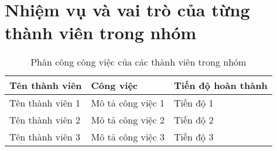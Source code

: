 \chapter{Nhiệm vụ và vai trò của từng thành viên trong nhóm}
\label{ch:team_roles}

\begin{table}[h!]
    \centering
    \begin{tabular}{|l|l|l|}
        \hline
        \textbf{Tên thành viên} & \textbf{Công việc} & \textbf{Tiến độ hoàn thành} \\
        \hline
        Tên thành viên 1 & Mô tả công việc 1 & Tiến độ 1 \\  
        \hline
        Tên thành viên 2 & Mô tả công việc 2 & Tiến độ 2 \\  
        \hline
        Tên thành viên 3 & Mô tả công việc 3 & Tiến độ 3 \\  
        \hline
    \end{tabular}
    \caption{Phân công công việc của các thành viên trong nhóm}
    \label{tab:team_tasks}
\end{table}

